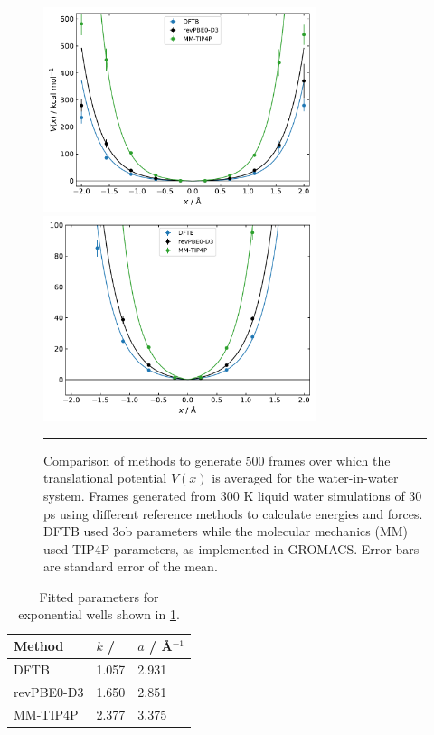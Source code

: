 \documentclass[../main.tex]{subfiles}
\begin{document}
\begin{figure}[h!]
	\centering
	\begin{minipage}[b]{0.49\textwidth}
		\includegraphics[width=8cm]{4/figs/figX3/xtb_wells.pdf}
	\end{minipage}
	\hfill
	\begin{minipage}[b]{0.49\textwidth}
		\includegraphics[width=8cm]{4/figs/figX3/xtb_wells_zoom.pdf}
	\end{minipage}
	\vspace{0.2cm}
	\hrule
	\caption{Comparison of methods to generate 500 frames over which the translational potential $V(x)$ is averaged for the water-in-water system. Frames generated from 300 K liquid water simulations of 30 ps using different reference methods to calculate energies and forces. DFTB used 3ob parameters while the molecular mechanics (MM) used TIP4P parameters, as implemented in GROMACS. Error bars are standard error of the mean.}
	\label{fig::entropy_X3c}
\end{figure}


\begin{table}[h!]
	\renewcommand{\arraystretch}{1.5}
	\begin{center}
		\small
		\begin{tabularx}{\textwidth}{YYY} 
			\toprule
			Method & $k$ / \kcal & $a$ / \AA$^{-1}$ \\
			\hline
			DFTB             &   1.057  & 2.931 \\
			revPBE0-D3  &   1.650  & 2.851 \\
			MM-TIP4P     &   2.377 & 3.375 \\
			\bottomrule
		\end{tabularx}
	\end{center}
	\caption{Fitted parameters for exponential wells shown in \figurename{ \ref{fig::entropy_X3c}}.} 
	\label{table::figX3c_params}
\end{table}
\end{document}
